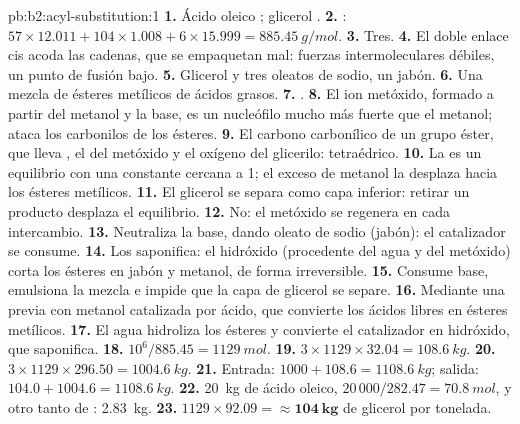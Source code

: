 \begin{solution}{pb:b2:acyl-substitution:1}
\textbf{1.} Ácido oleico ; glicerol .
\textbf{2.} : $57 \times 12.011 + 104 \times 1.008 + 6 \times 15.999 = \qty{885.45}{g/mol}$.
\textbf{3.} Tres.
\textbf{4.} El doble enlace cis acoda las cadenas, que se empaquetan mal: fuerzas intermoleculares débiles, un
punto de fusión bajo.
\textbf{5.} Glicerol y tres oleatos de sodio, un jabón.
\textbf{6.} Una mezcla de ésteres metílicos de ácidos grasos.
\textbf{7.} .
\textbf{8.} El ion metóxido, formado a partir del metanol y la base, es un nucleófilo mucho más fuerte que el
metanol; ataca los carbonilos de los ésteres.
\textbf{9.} El carbono carbonílico de un grupo éster, que lleva , el  del metóxido y el
oxígeno del glicerilo: tetraédrico.
\textbf{10.} La  es un equilibrio con una constante cercana a 1; el exceso de metanol la desplaza
hacia los ésteres metílicos.
\textbf{11.} El glicerol se separa como capa inferior: retirar un producto desplaza el equilibrio.
\textbf{12.} No: el metóxido se regenera en cada intercambio.
\textbf{13.} Neutraliza la base, dando oleato de sodio (jabón): el catalizador se consume.
\textbf{14.} Los saponifica: el hidróxido (procedente del agua y del metóxido) corta los ésteres en jabón y
metanol, de forma irreversible.
\textbf{15.} Consume base, emulsiona la mezcla e impide que la capa de glicerol se separe.
\textbf{16.} Mediante una  previa con metanol catalizada por ácido, que convierte los ácidos libres en
ésteres metílicos.
\textbf{17.} El agua hidroliza los ésteres y convierte el catalizador en hidróxido, que saponifica.
\textbf{18.} $10^6/885.45 = \qty{1129}{mol}$.
\textbf{19.} $3 \times 1129 \times 32.04 = \qty{108.6}{kg}$.
\textbf{20.} $3 \times 1129 \times 296.50 = \qty{1004.6}{kg}$.
\textbf{21.} Entrada: $1000 + 108.6 = \qty{1108.6}{kg}$; salida: $104.0 + 1004.6 = \qty{1108.6}{kg}$.
\textbf{22.} \qty{20}{kg} de ácido oleico, $20\,000/282.47 = \qty{70.8}{mol}$, y otro tanto de :
\qty{2.83}{kg}.
\textbf{23.} $1129 \times 92.09 = \boldsymbol{\approx \qty{104}{kg}}$ de glicerol por tonelada.
\end{solution}
